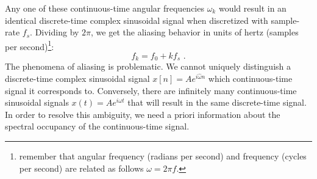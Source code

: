 Any one of these continuous-time angular frequencies $\omega_k$ would
result in an identical discrete-time complex sinusoidal signal when
discretized with sample-rate $f_s$. Dividing by
$2\pi$, we get the aliasing behavior in units of hertz (samples per
second)\footnote{remember that angular frequency (radians per second)
  and frequency (cycles per second) are related as follows $\omega = 2\pi
    f$.}:
\begin{equation}
  \boxed{
    f_k = f_0 + k f_s
  }\,\,.
\end{equation}
The phenomena of aliasing is problematic. We cannot uniquely
distinguish a discrete-time complex sinusoidal signal
$x[n]=Ae^{i\hat{\omega}n}$ which continuous-time signal it corresponds
to. Conversely, there are infinitely many continuous-time sinusoidal
signals $x(t)=Ae^{i\omega t}$ that will result in the same
discrete-time signal. In order to resolve this ambiguity, we need a
priori information about the spectral occupancy of the continuous-time
signal.

